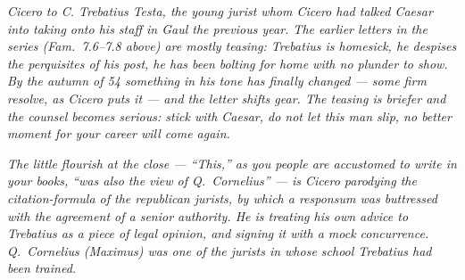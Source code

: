 
\textit{Cicero to C. Trebatius Testa, the young jurist whom Cicero had
talked Caesar into taking onto his staff in Gaul the previous year.
The earlier letters in the series (Fam.\ 7.6--7.8 above) are mostly
teasing: Trebatius is homesick, he despises the perquisites of his
post, he has been bolting for home with no plunder to show. By the
autumn of 54 something in his tone has finally changed --- some firm
resolve, as Cicero puts it --- and the letter shifts gear. The
teasing is briefer and the counsel becomes serious: stick with
Caesar, do not let this man slip, no better moment for your career
will come again.}

\textit{The little flourish at the close --- ``This,'' as you people
are accustomed to write in your books, ``was also the view of Q.\
Cornelius'' --- is Cicero parodying the citation-formula of the
republican jurists, by which a responsum was buttressed with the
agreement of a senior authority. He is treating his own advice to
Trebatius as a piece of legal opinion, and signing it with a mock
concurrence. Q.\ Cornelius (Maximus) was one of the jurists in whose
school Trebatius had been trained.}
